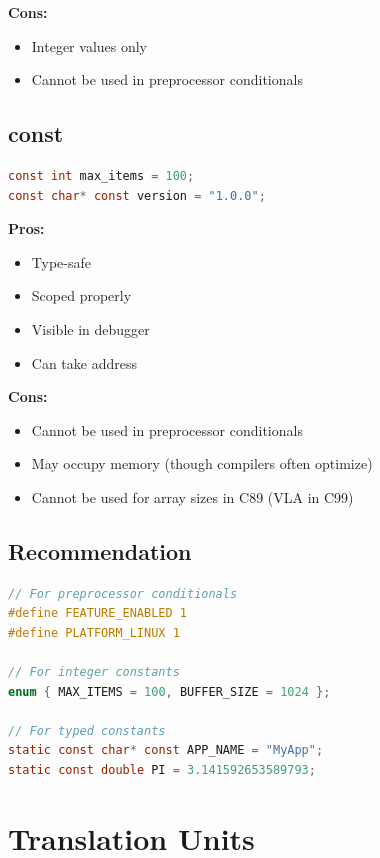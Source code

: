\textbf{Cons:}
\begin{itemize}
    \item Integer values only
    \item Cannot be used in preprocessor conditionals
\end{itemize}

\subsection{const}

\begin{lstlisting}[language=C]
const int max_items = 100;
const char* const version = "1.0.0";
\end{lstlisting}

\textbf{Pros:}
\begin{itemize}
    \item Type-safe
    \item Scoped properly
    \item Visible in debugger
    \item Can take address
\end{itemize}

\textbf{Cons:}
\begin{itemize}
    \item Cannot be used in preprocessor conditionals
    \item May occupy memory (though compilers often optimize)
    \item Cannot be used for array sizes in C89 (VLA in C99)
\end{itemize}

\subsection{Recommendation}

\begin{lstlisting}[language=C]
// For preprocessor conditionals
#define FEATURE_ENABLED 1
#define PLATFORM_LINUX 1

// For integer constants
enum { MAX_ITEMS = 100, BUFFER_SIZE = 1024 };

// For typed constants
static const char* const APP_NAME = "MyApp";
static const double PI = 3.141592653589793;
\end{lstlisting}

\section{Translation Units}

